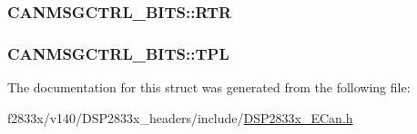 \subsubsection[{R\+T\+R}]{ C\+A\+N\+M\+S\+G\+C\+T\+R\+L\+\_\+\+B\+I\+T\+S\+::\+R\+T\+R}\label{struct_c_a_n_m_s_g_c_t_r_l___b_i_t_s_adee72d9fcbca6935a8c442d8eea502f2}
\hypertarget{struct_c_a_n_m_s_g_c_t_r_l___b_i_t_s_a079801f8d7f273ae605d40019ad1b0c3}{}
\subsubsection[{T\+P\+L}]{ C\+A\+N\+M\+S\+G\+C\+T\+R\+L\+\_\+\+B\+I\+T\+S\+::\+T\+P\+L}\label{struct_c_a_n_m_s_g_c_t_r_l___b_i_t_s_a079801f8d7f273ae605d40019ad1b0c3}


The documentation for this struct was generated from the following file\+:\begin{DoxyCompactItemize}
\item 
f2833x/v140/\+D\+S\+P2833x\+\_\+headers/include/\hyperlink{_d_s_p2833x___e_can_8h}{D\+S\+P2833x\+\_\+\+E\+Can.\+h}\end{DoxyCompactItemize}

